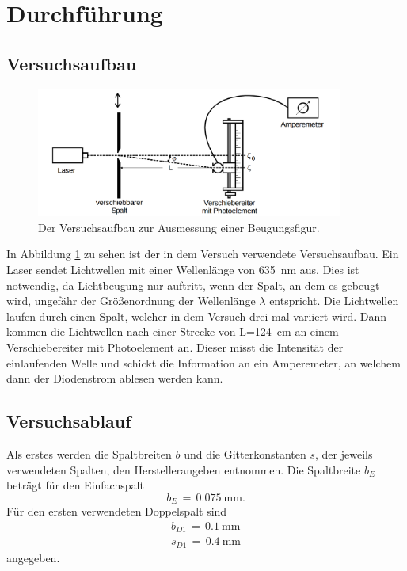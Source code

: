 \documentclass[
  bibliography=totoc,     %
  captions=tableheading,  %
  titlepage=firstiscover, %
]{scrartcl}
\begin{document}
\section{Durchführung}
\subsection{Versuchsaufbau}
\label{sec:Versuchsaufbau}
\begin{figure}[htb]
  \centering
  \includegraphics[width=0.9\textwidth]{V4063.png}
  \caption{Der Versuchsaufbau zur Ausmessung einer Beugungsfigur. \cite{anleitung}}
  \label{fig:V4063}
\end{figure}
In Abbildung \ref{fig:V4063} zu sehen ist der in dem Versuch verwendete Versuchsaufbau. Ein Laser sendet Lichtwellen mit einer Wellenlänge von \SI{635}{\nano\metre} aus. Dies ist notwendig, da Lichtbeugung nur auftritt, wenn der Spalt, an dem es gebeugt wird, ungefähr der Größenordnung der Wellenlänge $\lambda$ entspricht. Die Lichtwellen laufen durch einen Spalt, welcher in dem Versuch drei mal variiert wird. Dann kommen die Lichtwellen nach einer Strecke von L=\SI{124}{\centi\metre} an einem Verschiebereiter mit Photoelement an. Dieser misst die Intensität der einlaufenden Welle und schickt die Information an ein Amperemeter, an welchem dann der Diodenstrom ablesen werden kann.
\subsection{Versuchsablauf}
\label{sec:Versuchsablauf}
Als erstes werden die Spaltbreiten $b$ und die Gitterkonstanten $s$, der jeweils verwendeten Spalten, den Herstellerangeben entnommen.
Die Spaltbreite $b_E$ beträgt für den Einfachspalt
\begin{equation*}
  b_{E}\,=\,\SI{0.075}{\milli\metre}.
  \label{eqn:einfachspalt}
\end{equation*}
Für den ersten verwendeten Doppelspalt sind
\begin{align*}
  b_{D1}\,=\,\SI{0.1}{\milli\metre}\\
  s_{D1}\,=\,\SI{0.4}{\milli\metre}
  \label{eqn:doppelspalt1}
\end{align*}
angegeben.
\end{document}
